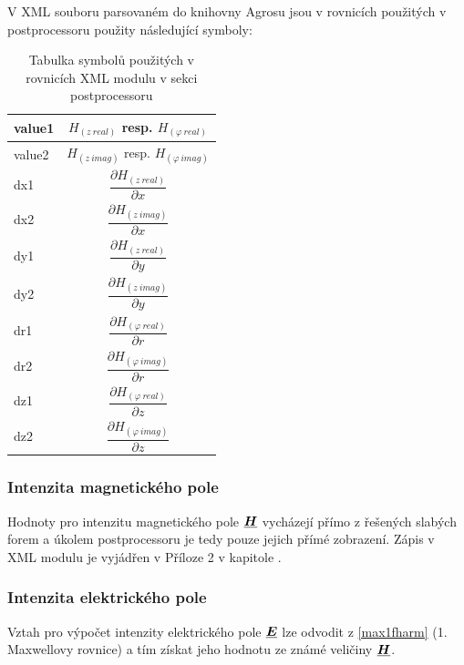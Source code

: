 \documentclass[12pt,a4paper,oneside]{article}
\numberwithin{equation}{section} %
\numberwithin{figure}{section} %
\numberwithin{table}{section} %
\renewcommand{\vec}[1]{\mbox{\boldmath$#1$}} %
\newcommand{\faz}[1]{{\underline{#1}}} %
\begin{document}
V XML souboru parsovaném do knihovny Agrosu jsou v rovnicích použitých v postprocessoru použity následující symboly:
\begin{table}[h] %
\caption{Tabulka symbolů použitých v rovnicích XML modulu v sekci postprocessoru}
\begin{center} %
\begin{tabular}{|l|c|} %
\hline %
value1 & $H _{(z~real)}$ resp. $H _{(\varphi ~real)}$ \\
\hline
value2 & $H _{(z~imag)}$ resp. $H _{(\varphi ~imag)}$ \\
\hline
dx1 & $\dfrac{\partial H _{(z~real)}}{\partial x}$ \\
\hline 
dx2 & $\dfrac{\partial H _{(z~imag)}}{\partial x}$ \\ 
\hline
dy1 & $\dfrac{\partial H _{(z~real)}}{\partial y}$ \\ 
\hline
dy2 & $\dfrac{\partial H _{(z~imag)}}{\partial y}$ \\ 
\hline
dr1 & $\dfrac{\partial H _{(\varphi ~real)}}{\partial r}$ \\ 
\hline 
dr2 & $\dfrac{\partial H _{(\varphi ~imag)}}{\partial r}$ \\ 
\hline
dz1 & $\dfrac{\partial H _{(\varphi ~real)}}{\partial z}$ \\ 
\hline
dz2 & $\dfrac{\partial H _{(\varphi ~imag)}}{\partial z}$ \\ 
\hline
\end{tabular}
\end{center}
\end{table} 



\subsubsection{Intenzita magnetického pole}
Hodnoty pro intenzitu magnetického pole $\faz{\vec{H}}$ vycházejí přímo z řešených slabých forem a úkolem postprocessoru je tedy pouze jejich přímé zobrazení. Zápis v XML modulu je vyjádřen v Příloze 2 v kapitole .

\subsubsection{Intenzita elektrického pole}
Vztah pro výpočet intenzity elektrického pole $\faz{\vec{E}}$ lze odvodit z \ref{max1fharm} (1. Maxwellovy rovnice) a tím získat jeho hodnotu ze známé veličiny $\faz{\vec{H}}$.
\end{document}
